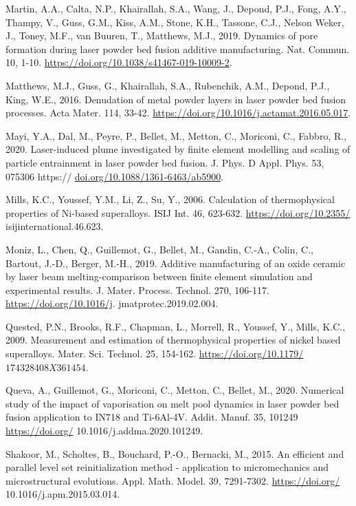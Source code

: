 \documentclass[10pt]{article}
\begin{document}
Martin, A.A., Calta, N.P., Khairallah, S.A., Wang, J., Depond, P.J., Fong, A.Y., Thampy, V., Guss, G.M., Kiss, A.M., Stone, K.H., Tassone, C.J., Nelson Weker, J., Toney, M.F., van Buuren, T., Matthews, M.J., 2019. Dynamics of pore formation during laser powder bed fusion additive manufacturing. Nat. Commun. 10, 1-10. \href{https://doi.org/10.1038/s41467-019-10009-2}{https://doi.org/10.1038/s41467-019-10009-2}.

Matthews, M.J., Guss, G., Khairallah, S.A., Rubenchik, A.M., Depond, P.J., King, W.E., 2016. Denudation of metal powder layers in laser powder bed fusion processes. Acta Mater. 114, 33-42. \href{https://doi.org/10.1016/j.actamat.2016.05.017}{https://doi.org/10.1016/j.actamat.2016.05.017}.

Mayi, Y.A., Dal, M., Peyre, P., Bellet, M., Metton, C., Moriconi, C., Fabbro, R., 2020. Laser-induced plume investigated by finite element modelling and scaling of particle entrainment in laser powder bed fusion. J. Phys. D Appl. Phys. 53, 075306 https:// \href{http://doi.org/10.1088/1361-6463/ab5900}{doi.org/10.1088/1361-6463/ab5900}.

Mills, K.C., Youssef, Y.M., Li, Z., Su, Y., 2006. Calculation of thermophysical properties of Ni-based superalloys. ISIJ Int. 46, 623-632. \href{https://doi.org/10.2355/}{https://doi.org/10.2355/} isijinternational.46.623.

Moniz, L., Chen, Q., Guillemot, G., Bellet, M., Gandin, C.-A., Colin, C., Bartout, J.-D., Berger, M.-H., 2019. Additive manufacturing of an oxide ceramic by laser beam melting-comparison between finite element simulation and experimental results. J. Mater. Process. Technol. 270, 106-117. \href{https://doi.org/10.1016/j}{https://doi.org/10.1016/j}. jmatprotec.2019.02.004.

Quested, P.N., Brooks, R.F., Chapman, L., Morrell, R., Youssef, Y., Mills, K.C., 2009. Measurement and estimation of thermophysical properties of nickel based superalloys. Mater. Sci. Technol. 25, 154-162. \href{https://doi.org/10.1179/}{https://doi.org/10.1179/} $174328408 X 361454$.

Queva, A., Guillemot, G., Moriconi, C., Metton, C., Bellet, M., 2020. Numerical study of the impact of vaporisation on melt pool dynamics in laser powder bed fusion application to IN718 and Ti-6Al-4V. Addit. Manuf. 35, 101249 \href{https://doi.org/}{https://doi.org/} 10.1016/j.addma.2020.101249.

Shakoor, M., Scholtes, B., Bouchard, P.-O., Bernacki, M., 2015. An efficient and parallel level set reinitialization method - application to micromechanics and microstructural evolutions. Appl. Math. Model. 39, 7291-7302. \href{https://doi.org/}{https://doi.org/} 10.1016/j.apm.2015.03.014.
\end{document}
